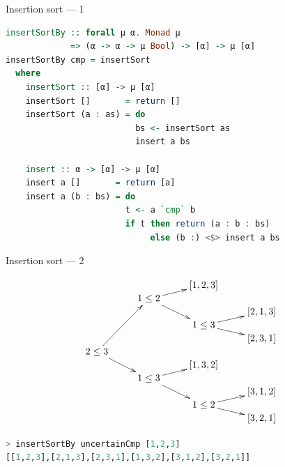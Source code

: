 \documentclass[handout]{beamer}
\begin{document}
\begin{frame}[fragile]{Insertion sort --- 1}

\begin{lstlisting}[language=Haskell]
insertSortBy :: forall μ α. Monad μ
             => (α -> α -> μ Bool) -> [α] -> μ [α]
insertSortBy cmp = insertSort
  where
    insertSort :: [α] -> μ [α]
    insertSort []       = return []
    insertSort (a : as) = do
                          bs <- insertSort as
                          insert a bs

    insert :: α -> [α] -> μ [α]
    insert a []       = return [a]
    insert a (b : bs) = do
                        t <- a `cmp` b
                        if t then return (a : b : bs)
                             else (b :) <$> insert a bs
\end{lstlisting}

\end{frame}

\begin{frame}[fragile]{Insertion sort --- 2}

$$\xymatrix@R-2.1pc{
                           &                         & [1,2,3]                &         \\
                           & 1 \le 2 \ar[ur]\ar[ddr] &                        &         \\
                           &                         &                        & [2,1,3] \\
                           &                         & 1 \le 3 \ar[ur]\ar[dr] &         \\
                           &                         &                        & [2,3,1] \\
2 \le 3 \ar[uuuur]\ar[ddr] &                         &                        &         \\
                           &                         & [1,3,2]                &         \\
                           & 1 \le 3 \ar[ur]\ar[ddr] &                        &         \\
                           &                         &                        & [3,1,2] \\
                           &                         & 1 \le 2 \ar[ur]\ar[dr] &         \\
                           &                         &                        & [3,2,1] \\
}$$

\begin{lstlisting}[language=Haskell]
> insertSortBy uncertainCmp [1,2,3]
[[1,2,3],[2,1,3],[2,3,1],[1,3,2],[3,1,2],[3,2,1]]
\end{lstlisting}

\end{frame}
\end{document}

